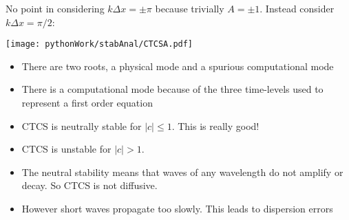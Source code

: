 No point in considering $k\Delta x=\pm\pi$ because trivially $A=\pm 1$. Instead consider $k\Delta x=\pi/2$:

\begin{minipage}{0.4\linewidth}
\texttt{[image: pythonWork/stabAnal/CTCSA.pdf]}
\end{minipage}
\begin{minipage}{0.58\linewidth}
\begin{itemize}\raggedright
\item There are two roots, a physical mode and a spurious computational mode
\item There is a computational mode because of the three time-levels used to represent a first order equation
\item CTCS is neutrally stable for $|c|\le 1$. This is really good!
\item CTCS is unstable for $|c|>1$.
\item The neutral stability means that waves of any wavelength do not amplify or decay. So CTCS is not diffusive.
\item However short waves propagate too slowly. This leads to dispersion errors
\end{itemize}
\end{minipage}

